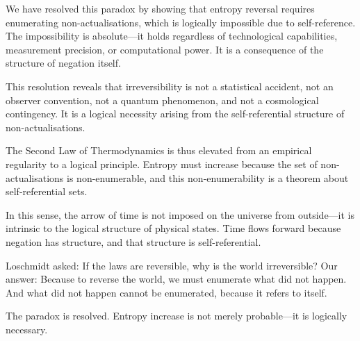 \documentclass[twocolumn,10pt]{article}
\theoremstyle{definition}
\theoremstyle{remark}
\begin{document}
We have resolved this paradox by showing that entropy reversal requires enumerating non-actualisations, which is logically impossible due to self-reference. The impossibility is absolute—it holds regardless of technological capabilities, measurement precision, or computational power. It is a consequence of the structure of negation itself.

This resolution reveals that irreversibility is not a statistical accident, not an observer convention, not a quantum phenomenon, and not a cosmological contingency. It is a logical necessity arising from the self-referential structure of non-actualisations.

The Second Law of Thermodynamics is thus elevated from an empirical regularity to a logical principle. Entropy must increase because the set of non-actualisations is non-enumerable, and this non-enumerability is a theorem about self-referential sets.

In this sense, the arrow of time is not imposed on the universe from outside—it is intrinsic to the logical structure of physical states. Time flows forward because negation has structure, and that structure is self-referential.

Loschmidt asked: If the laws are reversible, why is the world irreversible? Our answer: Because to reverse the world, we must enumerate what did not happen. And what did not happen cannot be enumerated, because it refers to itself.

The paradox is resolved. Entropy increase is not merely probable—it is logically necessary.
\end{document}
